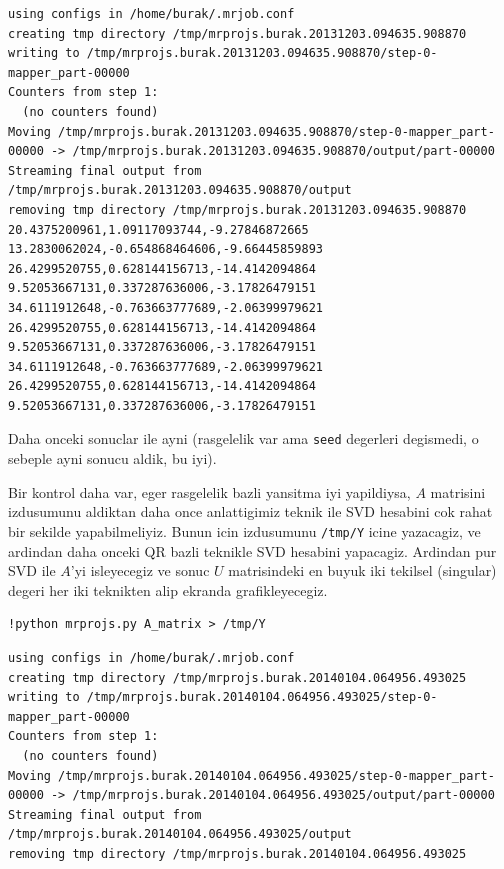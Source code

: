 \documentclass[12pt,fleqn]{article}\usepackage{../common}
\begin{document}
\begin{verbatim}
using configs in /home/burak/.mrjob.conf
creating tmp directory /tmp/mrprojs.burak.20131203.094635.908870
writing to /tmp/mrprojs.burak.20131203.094635.908870/step-0-mapper_part-00000
Counters from step 1:
  (no counters found)
Moving /tmp/mrprojs.burak.20131203.094635.908870/step-0-mapper_part-00000 -> /tmp/mrprojs.burak.20131203.094635.908870/output/part-00000
Streaming final output from /tmp/mrprojs.burak.20131203.094635.908870/output
removing tmp directory /tmp/mrprojs.burak.20131203.094635.908870
20.4375200961,1.09117093744,-9.27846872665
13.2830062024,-0.654868464606,-9.66445859893
26.4299520755,0.628144156713,-14.4142094864
9.52053667131,0.337287636006,-3.17826479151
34.6111912648,-0.763663777689,-2.06399979621
26.4299520755,0.628144156713,-14.4142094864
9.52053667131,0.337287636006,-3.17826479151
34.6111912648,-0.763663777689,-2.06399979621
26.4299520755,0.628144156713,-14.4142094864
9.52053667131,0.337287636006,-3.17826479151
\end{verbatim}

Daha onceki sonuclar ile ayni (rasgelelik var ama \verb!seed!
degerleri degismedi, o sebeple ayni sonucu aldik, bu iyi).

Bir kontrol daha var, eger rasgelelik bazli yansitma iyi yapildiysa, $A$
matrisini izdusumunu aldiktan daha once anlattigimiz teknik ile SVD
hesabini cok rahat bir sekilde yapabilmeliyiz. Bunun icin izdusumunu
\verb!/tmp/Y! icine yazacagiz, ve ardindan daha onceki QR bazli
teknikle SVD hesabini yapacagiz. Ardindan pur SVD ile $A$'yi isleyecegiz ve
sonuc $U$ matrisindeki en buyuk iki tekilsel (singular) degeri her iki
teknikten alip ekranda grafikleyecegiz.

\begin{verbatim}
!python mrprojs.py A_matrix > /tmp/Y
\end{verbatim}

\begin{verbatim}
using configs in /home/burak/.mrjob.conf
creating tmp directory /tmp/mrprojs.burak.20140104.064956.493025
writing to /tmp/mrprojs.burak.20140104.064956.493025/step-0-mapper_part-00000
Counters from step 1:
  (no counters found)
Moving /tmp/mrprojs.burak.20140104.064956.493025/step-0-mapper_part-00000 -> /tmp/mrprojs.burak.20140104.064956.493025/output/part-00000
Streaming final output from /tmp/mrprojs.burak.20140104.064956.493025/output
removing tmp directory /tmp/mrprojs.burak.20140104.064956.493025
\end{verbatim}
\end{document}
